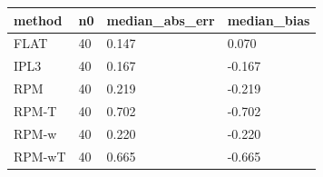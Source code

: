 \begin{tabular}{llll}
\hline
method & n0 & median\_abs\_err & median\_bias \\
\hline
FLAT & 40 & 0.147 & 0.070 \\
IPL3 & 40 & 0.167 & -0.167 \\
RPM & 40 & 0.219 & -0.219 \\
RPM-T & 40 & 0.702 & -0.702 \\
RPM-w & 40 & 0.220 & -0.220 \\
RPM-wT & 40 & 0.665 & -0.665 \\
\hline
\end{tabular}

